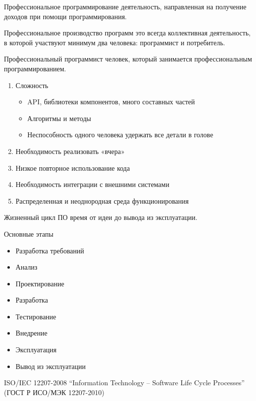 \documentclass{beamer}
\begin{document}
\begin{frame}[t]
\begin{block}{Профессиональное программирование}
деятельность, направленная на получение доходов при помощи
программирования. 
\end{block}
Профессиональное производство программ это всегда коллективная деятельность, в которой участвуют минимум два человека:
программист и потребитель.
\begin{block}{Профессиональный программист}
человек, который занимается профессиональным программированием. 
\end{block}
\end{frame}

\begin{frame}[t]
\begin{enumerate}
\item Сложность
\begin{itemize}
\item API, библиотеки компонентов, много составных частей
\item Алгоритмы и методы
\item Неспособность одного человека удержать все детали в голове
\end{itemize}
\item Необходимость реализовать «вчера» 
\item Низкое повторное использование кода
\item Необходимость интеграции с внешними системами
\item Распределенная и неоднородная среда
функционирования
\end{enumerate}
\end{frame}

\begin{frame}[t]
\begin{block}{Жизненный цикл ПО} 
время от идеи до вывода из эксплуатации. 
\end{block}
Основные этапы
\begin{itemize}
\item Разработка требований 
\item Анализ
\item Проектирование 
\item Разработка
\item Тестирование 
\item Внедрение
\item Эксплуатация 
\item Вывод из эксплуатации
\end{itemize}
ISO/IEC 12207-2008 “Information Technology – Software Life Cycle Processes” (ГОСТ Р ИСО/МЭК 12207-2010)
\end{frame}
\end{document}
